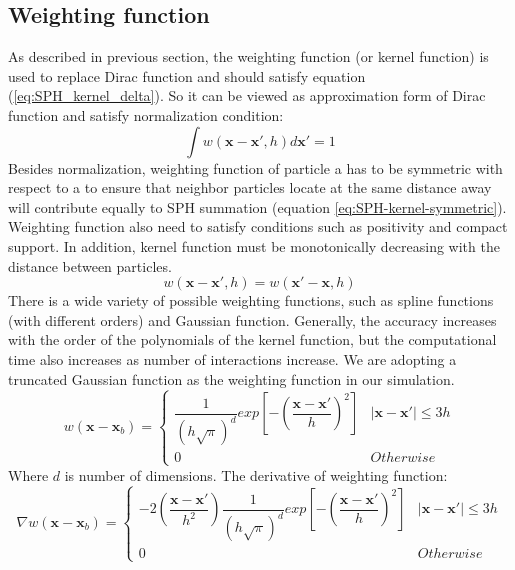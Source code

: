 \documentclass[10pt,a4paper]{article}
\begin{document}
\subsection{Weighting function}
As described in previous section, the weighting function (or kernel function) is used to replace Dirac function and should satisfy equation (\ref{eq:SPH_kernel_delta}). So it can be viewed as approximation form of Dirac function and satisfy normalization condition:
\begin{equation}
\int	 w(\textbf{x}-\textbf{x}\prime, h) d\textbf{x}\prime = 1
\label{eq:SPH-kernel-normalization-prop}
\end{equation}
Besides normalization, weighting function of particle a has to be symmetric with respect to a to ensure that neighbor particles locate at the same distance away will contribute equally to SPH summation (equation \ref{eq:SPH-kernel-symmetric}). Weighting function also need to satisfy conditions such as positivity and compact support. In addition, kernel function must be monotonically decreasing with the distance between particles.\\
\begin{equation}
w(\textbf{x}- \textbf{x} \prime, h) = w(\textbf{x} \prime - \textbf{x}, h)
\label{eq:SPH-kernel-symmetric}
\end{equation}
There is a wide variety of possible weighting functions, such as spline functions (with different orders) and Gaussian function. Generally, the accuracy increases with the order of the polynomials of the kernel function, but the computational time also increases as number of interactions increase. 
We are adopting a truncated Gaussian function as the weighting function in our simulation.
\begin{equation}
w(\textbf{x} - \textbf{x}_b) = 
\begin{cases} 
      \dfrac{1}{(h \sqrt{\pi})^d} exp [- (\dfrac{\textbf{x} - \textbf{x} \prime}{h})^2 ] &  \vert \textbf{x} - \textbf{x} \prime \vert \leq 3h\\
      0 & Otherwise
\end{cases}
\label{eq:SPH-kernel}
\end{equation}
Where $d$ is number of dimensions.
The derivative of weighting function:
\begin{equation}
\nabla w(\textbf{x} - \textbf{x}_b) = 
\begin{cases} 
      -2(\dfrac{\textbf{x} - \textbf{x} \prime}{h^2}) \dfrac{1}{(h \sqrt{\pi})^d} exp [- (\dfrac{\textbf{x} - \textbf{x} \prime}{h})^2 ] &  \vert \textbf{x} - \textbf{x} \prime \vert \leq 3h\\
      0 & Otherwise
\end{cases}
\end{equation}
\end{document}
